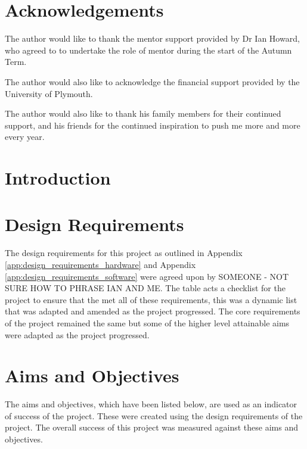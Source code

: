 \documentclass [11pt]{article}
\begin{document}
\newpage
\section*{Acknowledgements}

The author would like to thank the mentor support provided by Dr Ian Howard, who agreed to to undertake the role of mentor during the start of the Autumn Term.

The author would also like to acknowledge the financial support provided by the University of Plymouth. 

The author would also like to thank his family members for their continued support, and his friends for the continued inspiration to push me more and more every year.


		
\newpage			
{}
\setcounter{page}{1}
\tableofcontents 
\newpage

\listoffigures
\listoftables
\printglossaries

\newpage
\section{Introduction}



\section{Design Requirements}

The design requirements for this project as outlined in Appendix \ref{app:design_requirements_hardware} and Appendix \ref{app:design_requirements_software} were agreed upon by {SOMEONE - NOT SURE HOW TO PHRASE IAN AND ME}. The table acts a checklist for the project to ensure that the met all of these requirements, this was a dynamic list that was adapted and amended as the project progressed. The core requirements of the project remained the same but some of the higher level attainable aims were adapted as the project progressed. 

\section{Aims and Objectives}

The aims and objectives, which have been listed below, are used as an indicator of success of the project. These were created using the design requirements of the project. The overall success of this project was measured against these aims and objectives. 
\end{document}
